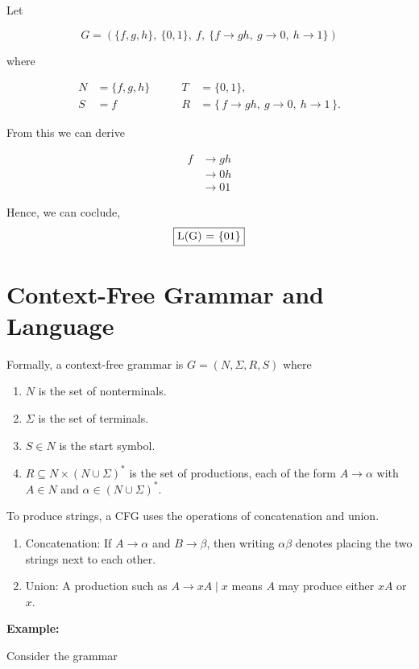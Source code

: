 \documentclass[12pt,a4paper,openany]{article}
\begin{document}
Let 

\[
G = (\{f, g, h\},\ \{0,1\},\ f,\ \{f \to gh,\ g \to 0,\ h \to 1\})
\]

where

\begin{align*}
N &= \{f, g, h\} \qquad & T &= \{0, 1\},\\
S &= f               \qquad & R &= \{\,f \to gh,\ g \to 0,\ h \to 1\,\}.
\end{align*}


From this we can derive 

\[
\begin{aligned}
f &\to gh \\
  &\to 0h \\
  &\to 01
\end{aligned}
\]

Hence, we can coclude, \[\fbox{L(G) = \{01\}}\]

\section{Context-Free Grammar and Language}

Formally, a context-free grammar is \(G=(N,\Sigma,R,S)\) where

\begin{enumerate}
    \item $N$ is the set of nonterminals.
    \item $\Sigma$ is the set of terminals.
    \item $S \in N$ is the start symbol.
    \item $R \subseteq N \times (N \cup \Sigma)^*$ is the set of productions, each of the form
    $A \to \alpha$ with $A \in N$ and $\alpha \in (N \cup \Sigma)^*$.
\end{enumerate}

To produce strings, a CFG uses the operations of concatenation and union.

\begin{enumerate}
    \item Concatenation: If $A \to \alpha$ and $B \to \beta$, then writing $\alpha\beta$
    denotes placing the two strings next to each other.

    \item Union: A production such as $A \to xA \mid x$ means 
    $A$ may produce either $xA$ or $x$.
\end{enumerate}


\textbf{Example:}

Consider the grammar
\end{document}

